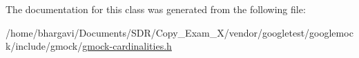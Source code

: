 The documentation for this class was generated from the following file\+:\begin{DoxyCompactItemize}
\item 
/home/bhargavi/\+Documents/\+S\+D\+R/\+Copy\+\_\+\+Exam\+\_\+X/vendor/googletest/googlemock/include/gmock/\hyperlink{gmock-cardinalities_8h}{gmock-\/cardinalities.\+h}\end{DoxyCompactItemize}
